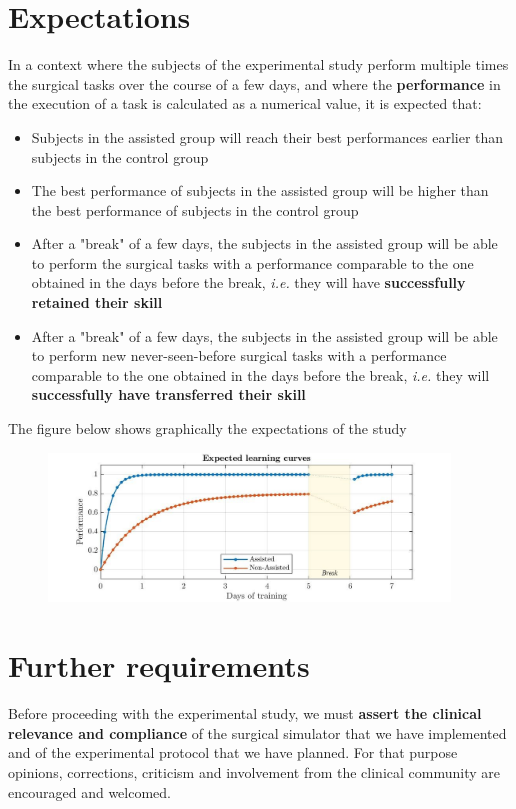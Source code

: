 \documentclass{article}
\begin{document}
\section{Expectations}
In a context where the subjects of the experimental study perform multiple times the surgical tasks over the course of a few days, and where the \textbf{performance} in the execution of a task is calculated as a numerical value, it is expected that:
\begin{itemize}
  \item Subjects in the assisted group will reach their best performances earlier than subjects in the control group
  \item The best performance of subjects in the assisted group will be higher than the best performance of subjects in the control group
  \item After a "break" of a few days, the subjects in the assisted group will be able to perform the surgical tasks with a performance comparable to the one obtained in the days before the break, \textit{i.e.} they will have \textbf{successfully retained their skill}
  \item After a "break" of a few days, the subjects in the assisted group will be able to perform new never-seen-before surgical tasks with a performance comparable to the one obtained in the days before the break, \textit{i.e.} they will \textbf{successfully have transferred their skill}
\end{itemize} 
The figure below shows graphically the expectations of the study

\begin{figure}[!h]
  \centering
  \includegraphics[width=0.95\textwidth]{expected.jpg}
\end{figure} 
\section{Further requirements}
Before proceeding with the experimental study, we must \textbf{assert the clinical relevance and compliance} of the surgical simulator that we have implemented and of the experimental protocol that we have planned. For that purpose opinions, corrections, criticism and involvement from the clinical community are encouraged and welcomed. 
\end{document}
